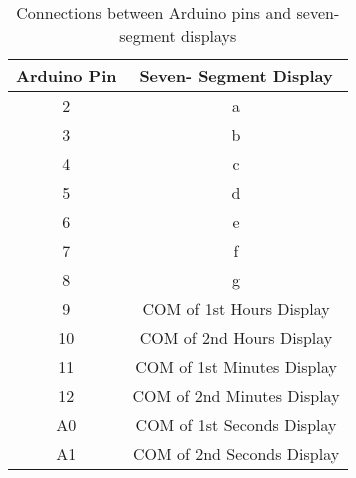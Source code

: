 \begin{table}[h!]
    \centering
    \begin{tabular}{|c|c|}
        \hline
        \textbf{Arduino Pin} & \textbf{Seven- Segment Display} \\
        \hline
        2  & a  \\
        3  & b  \\
        4  & c  \\
        5  & d  \\
        6  & e  \\
        7  & f  \\
        8  & g  \\
        9  & COM of 1st Hours Display \\
        10 & COM of 2nd Hours Display \\
        11 & COM of 1st Minutes Display \\
        12 & COM of 2nd Minutes Display \\
        A0 & COM of 1st Seconds Display \\
        A1 & COM of 2nd Seconds Display \\
        \hline
    \end{tabular}
    \caption{Connections between Arduino pins and seven-segment displays}
\end{table}
